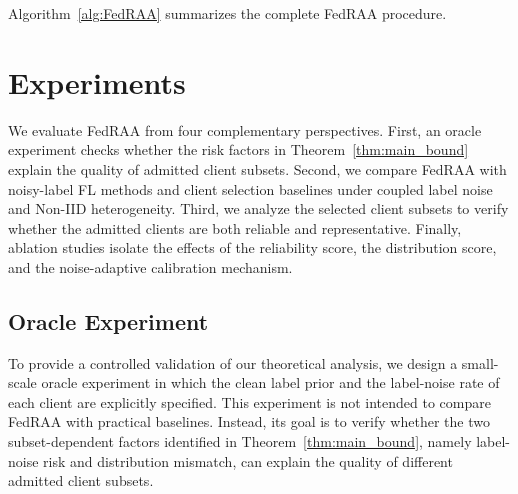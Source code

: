 \documentclass[conference]{IEEEtran}
\theoremstyle{definition}
\theoremstyle{remark}
\begin{document}


Algorithm~\ref{alg:FedRAA} summarizes the complete FedRAA procedure.



\section{Experiments}
\label{sec:experiment}

We evaluate FedRAA from four complementary perspectives. 
First, an oracle experiment checks whether the risk factors in Theorem~\ref{thm:main_bound} explain the quality of admitted client subsets. 
Second, we compare FedRAA with noisy-label FL methods and client selection baselines under coupled label noise and Non-IID heterogeneity. 
Third, we analyze the selected client subsets to verify whether the admitted clients are both reliable and representative. 
Finally, ablation studies isolate the effects of the reliability score, the distribution score, and the noise-adaptive calibration mechanism.

\subsection{Oracle Experiment}
\label{subsec:oracle_exp}

To provide a controlled validation of our theoretical analysis, we design a small-scale oracle experiment in which the clean label prior and the label-noise rate of each client are explicitly specified. 
This experiment is not intended to compare FedRAA with practical baselines. 
Instead, its goal is to verify whether the two subset-dependent factors identified in Theorem~\ref{thm:main_bound}, namely label-noise risk and distribution mismatch, can explain the quality of different admitted client subsets.
\end{document}
